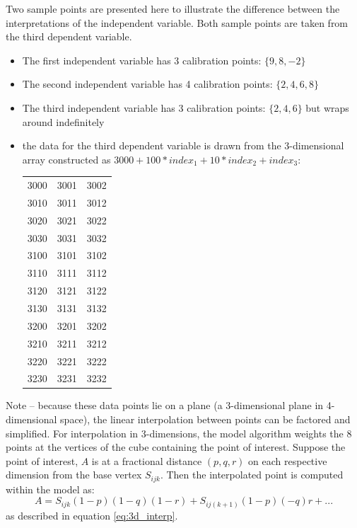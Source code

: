 \documentclass[11pt,fleqn]{report}
\begin{document}
Two sample points are presented here to illustrate the difference between the
interpretations of the independent variable.  Both sample points are taken
from the third dependent variable.
\begin{itemize}
  \item The first independent variable has 3 calibration points: $\{9,8,-2\}$
  \item The second independent variable has 4 calibration points: $\{2,4,6,8\}$
  \item The third independent variable has 3 calibration points: $\{2,4,6\}$ but
  wraps around indefinitely
  \item the data for the third dependent variable is drawn from the
  3-dimensional array constructed as
  $3000 + 100* index_1 + 10 * index_2 + index_3$:

  \begin{table}[ht]
  \begin{center}
  \begin{tabular}{|l|l|l|}
  \hline
  3000 & 3001 & 3002\\3010 & 3011 & 3012\\3020 & 3021 & 3022\\3030 & 3031 & 3032\\
  \hline
  3100 & 3101 & 3102\\3110 & 3111 & 3112\\3120 & 3121 & 3122\\3130 & 3131 & 3132\\
  \hline
  3200 & 3201 & 3202\\3210 & 3211 & 3212\\3220 & 3221 & 3222\\3230 & 3231 & 3232\\
  \hline
  \end{tabular}
  \end{center}
  \end{table}
\end{itemize}

Note -- because these data points lie on a plane (a 3-dimensional plane in
4-dimensional space), the linear interpolation between points can be
factored and simplified.  For interpolation in 3-dimensions, the model
algorithm weights the 8 points at the vertices of the cube containing the
point of interest.  Suppose the point of interest, $A$ is at a fractional
distance $(p,q,r)$  on each respective dimension from the base vertex
$S_{ijk}$.  Then the interpolated point is computed within the model as:
\begin{equation*}
A = S_{ijk}(1-p)(1-q)(1-r) + S_{ij(k+1)}(1-p)(-q)r + ...
\end{equation*}
as described in equation \ref{eq:3d_interp}.
\end{document}
